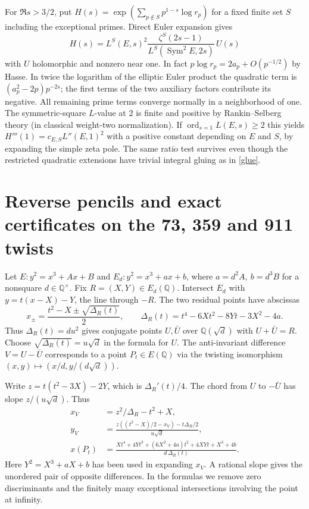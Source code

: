\documentclass[11pt]{article}
\begin{document}
For $\Re s>3/2$, put $H(s)=\exp(\sum_{p\notin S}p^{1-s}\log r_p)$ for a fixed finite set $S$ including the exceptional primes. Direct Euler expansion gives
\[
H(s)=L^S(E,s)^2\frac{\zeta^S(2s-1)}{L^S(\operatorname{Sym}^2 E,2s)}\,U(s)
\]
with $U$ holomorphic and nonzero near one. In fact $p\log r_p=2a_p+O(p^{-1/2})$ by Hasse. In twice the logarithm of the elliptic Euler product the quadratic term is $(a_p^2-2p)p^{-2s}$; the first terms of the two auxiliary factors contribute its negative. All remaining prime terms converge normally in a neighborhood of one. The symmetric-square $L$-value at $2$ is finite and positive by Rankin--Selberg theory (in classical weight-two normalization). If $\operatorname{ord}_{s=1} L(E,s)\ge2$ this yields
$H'''(1)=c_{E,S}L''(E,1)^2$ with a positive constant depending on $E$ and $S$, by expanding the simple zeta pole. The same ratio test survives even though the restricted quadratic extensions have trivial integral gluing as in \eqref{glue}.

\appendix
\section{Reverse pencils and exact certificates on the 73, 359 and 911 twists}

Let $E:y^2=x^3+Ax+B$ and
$E_d:y^2=x^3+a x+b$, where $a=d^2 A,\ b=d^3 B$ for a nonsquare
$d\in\mathbb Q^\times$. Fix $R=(X,Y)\in E_d(\mathbb Q)$.
Intersect $E_d$ with $y=t(x-X)-Y$, the line through $-R$.
The two residual points have abscissas
\[
 x_\pm=\frac{t^2-X\pm\sqrt{\Delta_R(t)}}2,\qquad
 \Delta_R(t)=t^4-6Xt^2-8Yt-3X^2-4a .
\]
Thus $\Delta_R(t)=d u^2$ gives conjugate points $U,\bar U$ over
$\mathbb Q(\sqrt d)$ with $U+\bar U=R$. Choose
$\sqrt{\Delta_R(t)}=u\sqrt d$ in the formula for $U$.
The anti-invariant difference $V=U-\bar U$ corresponds to a point
$P_t\in E(\mathbb Q)$ via the twisting isomorphism
$(x,y)\mapsto(x/d,y/(d\sqrt d))$.

Write $z=t(t^2-3X)-2Y$, which is $\Delta_R'(t)/4$.
The chord from $U$ to $-\bar U$ has slope $z/(u\sqrt d)$. Thus
\begin{align*}
 x_V&=z^2/\Delta_R-t^2+X,\\
 y_V&=\frac{z((t^2-X)/2-x_V)-t\Delta_R/2}{u\sqrt d},\\
 x(P_t)&=\frac{Xt^4+4Yt^3+(6X^2+4a)t^2+4XYt+X^3+4b}
                     {d\,\Delta_R(t)} .
\end{align*}
Here $Y^2=X^3+aX+b$ has been used in expanding $x_V$.
A rational slope gives the unordered pair of opposite differences.
In the formulas we remove zero discriminants and the finitely many
exceptional intersections involving the point at infinity.
\end{document}
